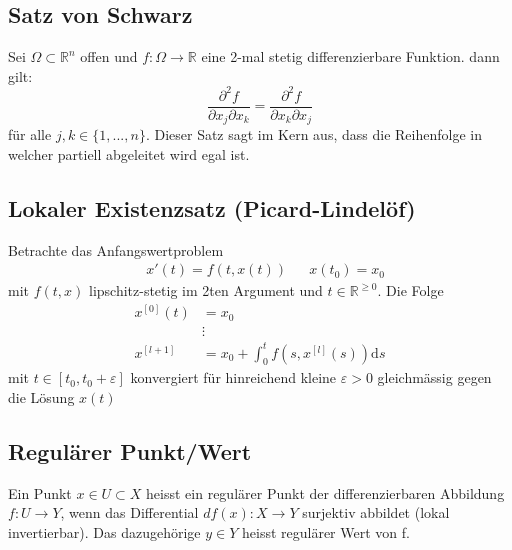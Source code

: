 \documentclass[8pt, a4paper, landscape, fleqn]{scrartcl}
\begin{document}
\begin{multicols*}{3}
			\subsection{Satz von Schwarz}
			Sei $\Omega \subset \mathbb{R}^n$ offen und $f:\Omega \rightarrow \mathbb{R}$ eine 2-mal stetig differenzierbare Funktion. dann gilt:
			\[\frac{\partial^2 f}{\partial x_j \partial x_k} = \frac{\partial^2 f}{\partial x_k \partial x_j}\]
			für alle $j,k \in \{1,...,n\}$. Dieser Satz sagt im Kern aus, dass die Reihenfolge in welcher partiell abgeleitet wird egal ist.
			\subsection{Lokaler Existenzsatz (Picard-Lindelöf)}
				Betrachte das Anfangswertproblem
				\begin{align*}
					&x'(t)=f(t, x(t)) & &x(t_0)=x_0
				\end{align*}
				mit $f(t, x)$ lipschitz-stetig im 2ten Argument und $t \in \mathbb{R}^{\ge 0}$. Die Folge
				\begin{align*}
					x^{[0]}(t)&=x_0\\
					&\vdots\\
					x^{[l+1]}&= x_0 + \int_{0}^{t} f(s, x^{[l]}(s)) \text{d}s
				\end{align*}
				mit $t \in [t_0, t_0 + \varepsilon]$ konvergiert für hinreichend kleine $\varepsilon>0$ gleichmässig gegen die Lösung $x(t)$
				
			\subsection{Regulärer Punkt/Wert}
			    Ein Punkt $x \in U \subset X$ heisst ein regulärer Punkt der differenzierbaren Abbildung $f: U \to Y$, wenn das Differential $df(x): X \to Y$ surjektiv abbildet (lokal invertierbar). Das dazugehörige $y \in Y$ heisst regulärer Wert von f.
			

\end{multicols*}
\end{document}
